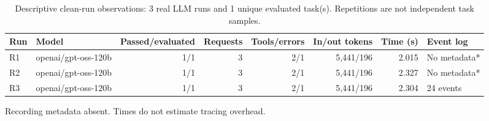 \begin{table}[t]
\centering
\small
\caption{Descriptive clean-run observations: 3 real LLM runs and 1 unique evaluated task(s). Repetitions are not independent task samples.}
\begin{tabular}{llrrrrrl}
\toprule
Run & Model & Passed/evaluated & Requests & Tools/errors & In/out tokens & Time (s) & Event log \\
\midrule
R1 & openai/gpt-oss-120b & 1/1 & 3 & 2/1 & 5,441/196 & 2.015 & No metadata* \\
R2 & openai/gpt-oss-120b & 1/1 & 3 & 2/1 & 5,441/196 & 2.327 & No metadata* \\
R3 & openai/gpt-oss-120b & 1/1 & 3 & 2/1 & 5,441/196 & 2.304 & 24 events \\
\bottomrule
\end{tabular}
\par\footnotesize * Recording metadata absent. Times do not estimate tracing overhead.
\end{table}
